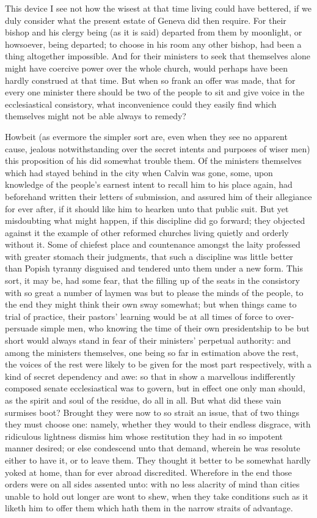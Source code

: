 This device I see not how the wisest at that time living could have bettered, if we duly consider what the present estate of Geneva did then require. For their bishop and his clergy being (as it is said) departed from them by moonlight, or howsoever, being departed; to choose in his room any other bishop, had been a thing altogether impossible. And for their ministers to seek that themselves alone might have coercive power over the whole church, would perhaps have been hardly construed at that time. But when so frank an offer was made, that for every one minister there should be two of the people to sit and give voice in the ecclesiastical consistory, what inconvenience could they easily find which themselves might not be able always to remedy?

Howbeit (as evermore the simpler sort are, even when they see no apparent cause, jealous notwithstanding over the secret intents and purposes of wiser men) this proposition of his did somewhat trouble them. Of the ministers themselves which had stayed behind in the city when Calvin was gone, some, upon knowledge of the people’s earnest intent to recall him to his place again, had beforehand written their letters of submission, and assured him of their allegiance for ever after, if it should like him to hearken unto that public suit. But yet misdoubting what might happen, if this discipline did go forward; they objected against it the example of other reformed churches living quietly and orderly without it. Some of chiefest place and countenance amongst the laity professed with greater stomach their judgments, that such a discipline was little better than Popish tyranny disguised and tendered unto them under a new form. This sort, it may be, had some fear, that the filling up of the seats in the consistory with so great a number of laymen was but to please the minds of the people, to the end they might think their own sway somewhat; but when things came to trial of practice, their pastors’ learning would be at all times of force to over-persuade simple men, who knowing the time of their own presidentship to be but short would always stand in fear of their ministers’ perpetual authority: and among the ministers themselves, one being so far in estimation above the rest, the voices of the rest were likely to be given for the most part respectively, with a kind of secret dependency and awe: so that in show a marvellous indifferently composed senate ecclesiastical was to govern, but in effect one only man should, as the spirit and soul of the residue, do all in all. But what did these vain surmises boot? Brought they were now to so strait an issue, that of two things they must choose one: namely, whether they would to their endless disgrace, with ridiculous lightness dismiss him whose restitution they had in so impotent manner desired; or else condescend unto that demand, wherein he was resolute either to have it, or to leave them. They thought it better to be somewhat hardly yoked at home, than for ever abroad discredited. Wherefore in the end those orders were on all sides assented unto: with no less alacrity of mind than cities unable to hold out longer are wont to shew, when they take conditions such as it liketh him to offer them which hath them in the narrow straits of advantage.

